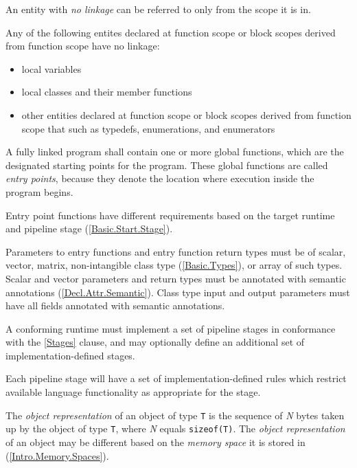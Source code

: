 
\p An entity with \textit{no linkage} can be referred to only from the scope it
is in.

\p Any of the following entites declared at function scope or block scopes
derived from function scope have no linkage:
\begin{itemize}
  \item local variables
  \item local classes and their member functions
  \item other entities declared at function scope or block scopes derived from
  function scope that such as typedefs, enumerations, and enumerators
\end{itemize}


\p A fully linked program shall contain one or more global functions, which are
the designated starting points for the program. These global functions are
called \textit{entry points}, because they denote the location where execution
inside the program begins.

\p Entry point functions have different requirements based on the target runtime
and pipeline stage (\ref{Basic.Start.Stage}).

\p Parameters to entry functions and entry function return types must be of
scalar, vector, matrix, non-intangible class type (\ref{Basic.Types}), or array
of such types. Scalar and vector parameters and return types must be annotated
with semantic annotations (\ref{Decl.Attr.Semantic}). Class type input and
output parameters must have all fields annotated with semantic annotations.


\p A conforming runtime must implement a set of pipeline stages in conformance
with the \ref{Stages} clause, and may optionally define an additional set of
implementation-defined stages.

\p Each pipeline stage will have a set of implementation-defined rules which
restrict available language functionality as appropriate for the stage.


\p The \textit{object representation} of an object of type \texttt{T} is the
sequence of \textit{N} bytes taken up by the object of type \texttt{T}, where
\textit{N} equals \texttt{sizeof(T)}. The \textit{object representation} of an
object may be different based on the \textit{memory space} it is stored in
(\ref{Intro.Memory.Spaces}).

